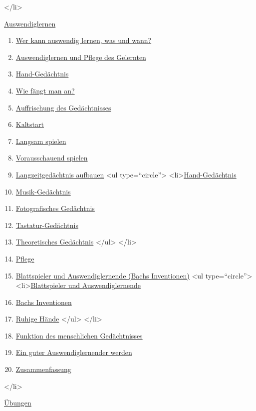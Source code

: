  </li>
 \item \hyperref[c1iii6]{Auswendiglernen}
  \begin{enumerate}[label={\alph*.}] 
   <li>\hyperref[c1iii6a]{Warum auswendig lernen?}
   \item \hyperref[c1iii6b]{Wer kann auswendig lernen, was und wann?}
   \item \hyperref[c1iii6c]{Auswendiglernen und Pflege des Gelernten}
   \item \hyperref[c1iii6d]{Hand-Gedächtnis}
   \item \hyperref[c1iii6e]{Wie fängt man an?}
   \item \hyperref[c1iii6f]{Auffrischung des Gedächtnisses}
   \item \hyperref[c1iii6g]{Kaltstart}
   \item \hyperref[c1iii6h]{Langsam spielen}
   \item \hyperref[c1iii6i]{Vorausschauend spielen}
   \item \hyperref[c1iii6j]{Langzeitgedächtnis aufbauen}
    <ul type=\enquote{circle}>
     <li>\hyperref[c1iii6hand]{Hand-Gedächtnis}
     \item \hyperref[c1iii6musik]{Musik-Gedächtnis}
     \item \hyperref[c1iii6foto]{Fotografisches Gedächtnis}
     \item \hyperref[c1iii6tastatur]{Tastatur-Gedächtnis}
     \item \hyperref[c1iii6theorie]{Theoretisches Gedächtnis}
    </ul>
   </li>
   \item \hyperref[c1iii6k]{Pflege}
   \item \hyperref[c1iii6l]{Blattspieler und Auswendiglernende (Bachs Inventionen)}
    <ul type=\enquote{circle}>
     <li>\hyperref[c1iii6l]{Blattspieler und Auswendiglernende}
     \item \hyperref[c1iii6l2]{Bachs Inventionen}
     \item \hyperref[ruhig]{Ruhige Hände}
    </ul>
   </li>
   \item \hyperref[c1iii6m]{Funktion des menschlichen Gedächtnisses}
   \item \hyperref[c1iii6n]{Ein guter Auswendiglernender werden}
   \item \hyperref[c1iii6o]{Zusammenfassung}
   \end{enumerate}
 </li>
 \item \hyperref[c1iii7]{Übungen}

